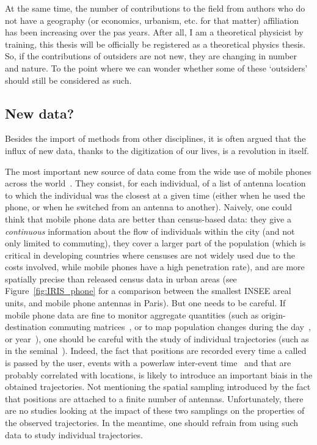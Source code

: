 At the same time, the number of contributions to the field from authors who do
not have a geography (or economics, urbanism, etc. for that matter) affiliation
has been increasing over the pas years. After all, I am a theoretical physicist
by training, this thesis will be officially be registered as a theoretical
physics thesis. So, if the contributions of outsiders are not new, they are
changing in number and nature. To the point where we can wonder whether some of
these `outsiders' should still be considered as such.



\subsection{New data?}
\label{sub:new_data}

Besides the import of methods from other disciplines, it is often argued that
the influx of new data, thanks to the digitization of our lives, is a revolution
in itself. 

The most important new source of data come from the wide use of mobile phones
across the world~\cite{Gonzalez:2008,Fen-Chong:2012}. They consist, for each individual, of a
list of antenna location to which the individual was the closest at a given time
(either when he used the phone, or when he switched from an antenna to another).
Naively, one could think that mobile phone data are better than census-based
data: they give a \emph{continuous} information about the flow of individuals
within the city (and not only limited to commuting), they cover a larger part of
the population (which is critical in developing countries where censuses are not
widely used due to the costs involved, while mobile phones have a high
penetration rate), and are more spatially precise than released census data in
urban areas (see Figure~\ref{fig:IRIS_phone} for a comparison between the smallest
INSEE areal units, and mobile phone antennas in Paris). But one needs to be
careful. If mobile phone data are fine to monitor aggregate quantities (such as
origin-destination commuting matrices~\cite{Lenormand:2014}, or to map
population changes during the day~\cite{Louail:2014}, or year~\cite{Deville:2014}), one should be careful with the study of
individual trajectories (such as in the
seminal~\cite{Gonzalez:2008,Song:2010_modelling,Song:2010_limits}). Indeed, the
fact that positions are recorded every time a called is passed by the user,
events with a powerlaw inter-event time~\cite{Song:2010_modelling} and that are
probably correlated with locations, is likely to introduce an important biais in
the obtained trajectories. Not mentioning the spatial sampling introduced by the
fact that positions are attached to a finite number of antennas. Unfortunately,
there are no studies looking at the impact of these two samplings on the
properties of the observed trajectories. In the meantime, one should refrain
from using such data to study individual trajectories.

